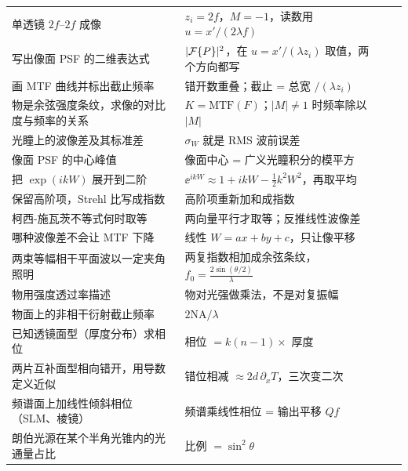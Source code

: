 {\begin{longtable}{@{}P{6.6cm}P{8.5cm}>{\raggedleft\arraybackslash}p{0.8cm}>{\raggedleft\arraybackslash}p{0.8cm}@{}}
单透镜 $2f$–$2f$ 成像 & $z_i=2f$，$M=-1$，读数用 $u=x'/(2\lambda f)$ & \pageref{sec:lensimg} & \pageref{ex:v-3slit}\\
写出像面 PSF 的二维表达式 & $|\mathcal{F}\{P\}|^2$，在 $u=x'/(\lambda z_i)$ 取值，两个方向都写 & \pageref{sec:typeD} & \pageref{ex:v-3slit}\\
画 MTF 曲线并标出截止频率 & 错开数重叠；截止 = 总宽 $/(\lambda z_i)$ & \pageref{rcp:mtfoverlap} & \pageref{ex:v-3slit}\\
物是余弦强度条纹，求像的对比度与频率的关系 & $K=\mathrm{MTF}(F)$；$|M|\ne1$ 时频率除以 $|M|$ & \pageref{sec:typeE} & \pageref{ex:v-3slit}\\
光瞳上的波像差及其标准差 & $\sigma_W$ 就是 RMS 波前误差 & \pageref{sec:aberrms} & \pageref{ex:v-strehl}\\
像面 PSF 的中心峰值 & 像面中心 = 广义光瞳积分的模平方 & \pageref{sec:strehl} & \pageref{ex:v-strehl}\\
把 $\exp(ikW)$ 展开到二阶 & $\ee^{ikW}\approx1+ikW-\frac12k^2W^2$，再取平均 & \pageref{ex:strehl-tplA} & \pageref{ex:v-strehl}\\
保留高阶项，Strehl 比写成指数 & 高阶项重新加和成指数 & \pageref{ex:strehl-tplB} & \pageref{ex:v-strehl2}\\
柯西-施瓦茨不等式何时取等 & 两向量平行才取等；反推线性波像差 & \pageref{sec:mtfproof} & \pageref{ex:v-mtf}\\
哪种波像差不会让 MTF 下降 & 线性 $W=ax+by+c$，只让像平移 & \pageref{sec:mtfproof} & \pageref{ex:v-mtf}\\
两束等幅相干平面波以一定夹角照明 & 两复指数相加成余弦条纹，$f_0=\frac{2\sin(\theta/2)}{\lambda}$ & \pageref{sec:twobeam} & \pageref{ex:v-sim}\\
物用强度透过率描述 & 物对光强做乘法，不是对复振幅 & \pageref{sec:sim} & \pageref{ex:v-sim}\\
物面上的非相干衍射截止频率 & $2\mathrm{NA}/\lambda$ & \pageref{sec:typeA} & \pageref{ex:v-sim}\\
已知透镜面型（厚度分布）求相位 & 相位 $=k(n-1)\times$ 厚度 & \pageref{sec:screens} & \pageref{ex:v-alvarez}\\
两片互补面型相向错开，用导数定义近似 & 错位相减 $\approx2d\,\partial_xT$，三次变二次 & \pageref{sec:alvarezi} & \pageref{ex:v-alvarez}\\
频谱面上加线性倾斜相位（SLM、棱镜） & 频谱乘线性相位 = 输出平移 $Qf$ & \pageref{sec:linphase} & \pageref{ex:v-alvarez}\\
朗伯光源在某个半角光锥内的光通量占比 & 比例 $=\sin^2\theta$ & \pageref{sec:lambert} & \pageref{sec:exgC}\\

\end{longtable}}

